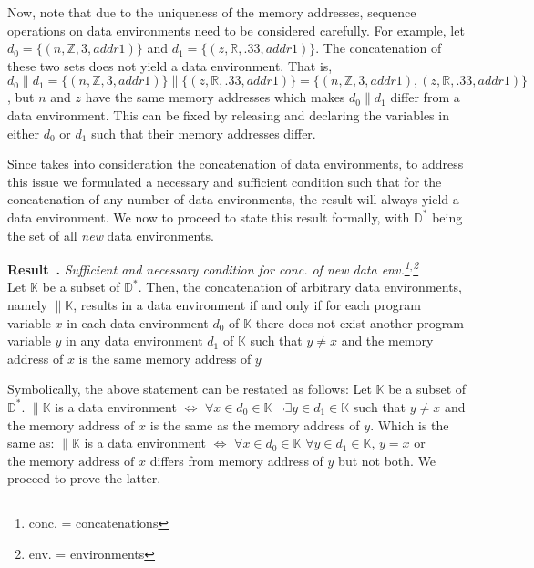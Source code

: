 \documentclass[11pt]{article}
\newcounter{definition}
\newcounter{example}
\newcounter{result}
\newenvironment{result}[1][]{\stepcounter{result}\par\medskip\noindent
\textbf{Result~\theresult. #1} \rmfamily}{\medskip}
\begin{document}
Now, note that due to the uniqueness of the memory addresses, sequence operations on data environments need to be considered carefully. For example, let $d_0=\{(n,\mathbb{Z},3, addr1)\}$ and $d_1=\{(z,\mathbb{R},.33, addr1)\}$. The concatenation of these two sets does not yield a data environment. That is, $d_0 \| d_1 = \{(n,\mathbb{Z},3, addr1)\}\| \{(z,\mathbb{R},.33, addr1)\} = \{(n,\mathbb{Z},3, addr1), (z,\mathbb{R},.33, addr1)\}$, but $n$ and $z$ have the same memory addresses which makes $d_0 \| d_1$ differ from a data environment. This can be fixed by releasing and declaring the variables in either $d_0$ or $d_1$ such that their memory addresses differ.

Since \cite{baber} takes into consideration the concatenation of data environments, to address this issue we formulated a necessary and sufficient condition such that for the concatenation of any number of data environments, the result will always yield a data environment. We now to proceed to state this result formally, with $\mathbb{D}^{*}$ being the set of all \emph{new} data environments.


\begin{result}\emph{Sufficient and necessary condition for conc. of new data env.\footnote{conc. = concatenations}$^{,}$\footnote{env. = environments}} \\
 Let $\mathbb{K}$ be a subset of $\mathbb{D}^{*}$. Then, the concatenation of arbitrary data environments, namely $\|\mathbb{K}$, results in a data environment if and only if for each program variable $x$ in each data environment $d_0$ of $\mathbb{K}$ there does not exist another program variable $y$ in any data environment $d_1$ of $\mathbb{K}$ such that $y\neq x$ and the memory address of $x$ is the same memory address of $y$
\end{result}

Symbolically, the above statement can be restated as follows: Let $\mathbb{K}$ be a subset of $\mathbb{D}^{*}$. $\|\mathbb{K}$ is a data environment $\Leftrightarrow$ $\forall x\in d_0\in\mathbb{K}$ $\neg \exists y \in d_1 \in \mathbb{K}$ such that $y\neq x$ and $\text{the memory address of }x$ is the same as the memory address of $y$. Which is the same as: $\|\mathbb{K}$ is a data environment $\Leftrightarrow$ $\forall x\in d_0\in\mathbb{K}$ $\forall y \in d_1 \in \mathbb{K}$, $y=x$ or $\text{the memory address of }x$ differs from memory address of $y$ but not both. We proceed to prove the latter.
\end{document}
